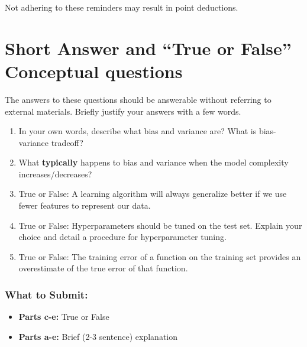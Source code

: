 \documentclass{article}
\begin{document}
Not adhering to these reminders may result in point deductions. \\



\clearpage{}



\section*{Short Answer and ``True or False'' Conceptual questions}
\begin{aprob}
    The answers to these questions should be answerable without referring to external materials.  Briefly justify your answers with a few words.
    \begin{enumerate}
        \item{} In your own words, describe what bias and variance are? What is bias-variance tradeoff?
        \item {} What \textbf{typically} happens to bias and variance when the model complexity increases/decreases?
        \item {} True or False: A learning algorithm will always generalize better if we use fewer features to represent our data. 
        \item {} True or False: Hyperparameters should be tuned on the test set. Explain your choice and detail a procedure for hyperparameter tuning.
        \item {} True or False: The training error of a function on the training set provides an overestimate of the true error of that function.
    \end{enumerate}
    \subsubsection*{What to Submit:}
    \begin{itemize}
        \item \textbf{Parts c-e:} True or False
        \item \textbf{Parts a-e:} Brief (2-3 sentence) explanation
    \end{itemize}
\end{aprob}
\end{document}
